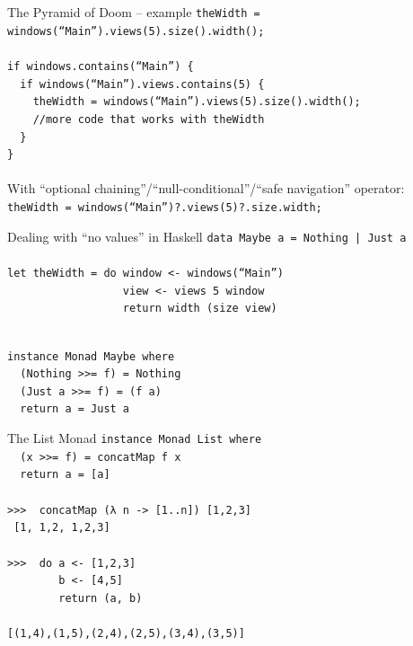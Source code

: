 \documentclass{beamer}
\newcommand{\prompt}{\phantom{}>\phantom{}>\phantom{}>\ }
\begin{document}
\begin{frame}{The Pyramid of Doom -- example} \pause
  {\footnotesize
    \texttt{theWidth = windows(``Main'').views(5).size().width();} \\ \pause
    \ \\
    \texttt{if windows.contains(``Main'') \{ \\
      \ \ if windows(``Main'').views.contains(5) \{ \\
      \ \ \ \ theWidth = windows(``Main'').views(5).size().width();\\
      \ \ \ \ //more code that works with theWidth\\
      \ \ \}\\
      \}\\
    } \pause
    \ \\
    With ``optional chaining''/``null-conditional''/``safe navigation''
    operator: \\ \pause
    \texttt{theWidth = windows(``Main'')?.views(5)?.size.width;}
  }
\end{frame}

\begin{frame}{Dealing with ``no values'' in Haskell} \pause
  \texttt{data Maybe a = Nothing | Just a} \\ \pause
  \ \\
  \texttt{let theWidth = do window <- windows(``Main'')\\
    \ \ \ \ \ \ \ \ \ \ \ \ \ \ \ \ \ \ view <- views 5 window\\
    \ \ \ \ \ \ \ \ \ \ \ \ \ \ \ \ \ \ return width (size view)\\
  } \ \\ \pause
  
  \texttt{instance Monad Maybe where\\ \pause
    \ \ (Nothing >>= f) = Nothing\\ \pause
    \ \ (Just a >>= f) = (f a)\\ \pause
    \ \ return a = Just a}
\end{frame}

\begin{frame}{The List Monad}
  \texttt{instance Monad List where\\ \pause
    \ \ (x >>= f) = concatMap f x \\ \pause
    \ \ return a = [a] \\ \pause
  } \ \\
  \texttt{\prompt{} concatMap (λ n -> [1..n]) [1,2,3]} \\ \pause
  \texttt{ [1, 1,2, 1,2,3] } \\ \ \\ \pause
  \texttt{\prompt{} do a <- [1,2,3] \\
    \ \ \ \ \ \ \ \ b <- [4,5] \\
    \ \ \ \ \ \ \ \ return (a, b)} \\ \pause
  \ \\
  \texttt{[(1,4),(1,5),(2,4),(2,5),(3,4),(3,5)]}
\end{frame}
\end{document}
